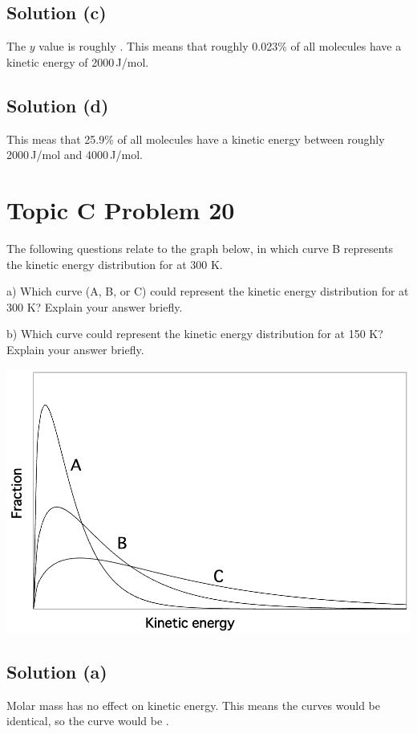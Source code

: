 \documentclass[10pt]{article}
\begin{document}
        \subsection{Solution (c)}
            The $y$ value is roughly . 
            This means that roughly 0.023\% of all molecules have a kinetic energy of 2000\,\unit{\joule/\mole}. 
        
        \subsection{Solution (d)}
            This meas that 25.9\% of all molecules have a kinetic energy between roughly 2000\,\unit{\joule/\mole} and 4000\,\unit{\joule/\mole}. 

    \pagebreak
    \section{Topic C Problem 20}
        The following questions relate to the graph below, in which curve B represents the kinetic energy distribution for  at 300 K.

        a) Which curve (A, B, or C) could represent the kinetic energy distribution for  at 300 K? Explain your answer briefly.

        b) Which curve could represent the kinetic energy distribution for  at 150 K? Explain your answer briefly.

        \begin{center}
            \includegraphics[width=\textwidth]{picture_C-20.png}
        \end{center}

        \subsection{Solution (a)}
            Molar mass has no effect on kinetic energy. 
            This means the curves would be identical, so the curve would be .
\end{document}
